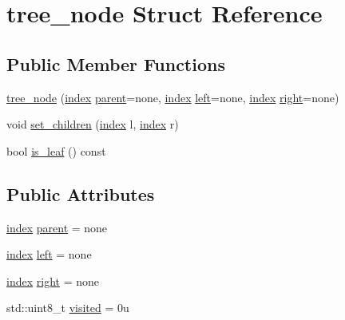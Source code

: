 \hypertarget{structtree__node}{}\section{tree\+\_\+node Struct Reference}
\label{structtree__node}
\subsection*{Public Member Functions}
\begin{DoxyCompactItemize}
\item 
\hyperlink{structtree__node_a835de19906d9a6b2f2c8f20345be4839}{tree\+\_\+node} (\hyperlink{tree__gen_8cpp_a7376ecf9f645bcbaa2f0459e17d7588f}{index} \hyperlink{structtree__node_ab8bbd1b843e135810fc96529bc452d22}{parent}=none, \hyperlink{tree__gen_8cpp_a7376ecf9f645bcbaa2f0459e17d7588f}{index} \hyperlink{structtree__node_a6ee3ea07f568423adde3b6911ea3b041}{left}=none, \hyperlink{tree__gen_8cpp_a7376ecf9f645bcbaa2f0459e17d7588f}{index} \hyperlink{structtree__node_a244a10f0fa615392414c301291ba2c47}{right}=none)
\item 
void \hyperlink{structtree__node_acd3e8c452abe8574fbf7b2d1ce52ccfc}{set\+\_\+children} (\hyperlink{tree__gen_8cpp_a7376ecf9f645bcbaa2f0459e17d7588f}{index} l, \hyperlink{tree__gen_8cpp_a7376ecf9f645bcbaa2f0459e17d7588f}{index} r)
\item 
bool \hyperlink{structtree__node_a2c35968103d4326090dcd4b100c1fd56}{is\+\_\+leaf} () const
\end{DoxyCompactItemize}
\subsection*{Public Attributes}
\begin{DoxyCompactItemize}
\item 
\hyperlink{tree__gen_8cpp_a7376ecf9f645bcbaa2f0459e17d7588f}{index} \hyperlink{structtree__node_ab8bbd1b843e135810fc96529bc452d22}{parent} = none
\item 
\hyperlink{tree__gen_8cpp_a7376ecf9f645bcbaa2f0459e17d7588f}{index} \hyperlink{structtree__node_a6ee3ea07f568423adde3b6911ea3b041}{left} = none
\item 
\hyperlink{tree__gen_8cpp_a7376ecf9f645bcbaa2f0459e17d7588f}{index} \hyperlink{structtree__node_a244a10f0fa615392414c301291ba2c47}{right} = none
\item 
std\+::uint8\+\_\+t \hyperlink{structtree__node_a2cd221687b1d31a8d5e78a754b1cb53c}{visited} = 0u
\end{DoxyCompactItemize}


